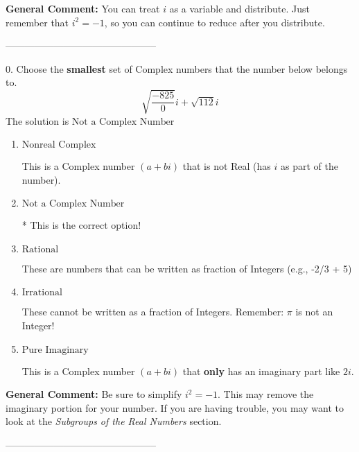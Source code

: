 \documentclass{extbook}[14pt]
\begin{document}
\textbf{General Comment:} You can treat $i$ as a variable and distribute. Just remember that $i^2=-1$, so you can continue to reduce after you distribute. 

-----------------------------------------------

0. Choose the \textbf{smallest} set of Complex numbers that the number below belongs to.
\[ \sqrt{\frac{-825}{0}} i+\sqrt{112}i \] 
The solution is $ \text{Not a Complex Number} $ 

\begin{enumerate}[label=\Alph*.] 
\item $ \text{Nonreal Complex} $ 

 This is a Complex number $(a+bi)$ that is not Real (has $i$ as part of the number). 
\item $ \text{Not a Complex Number} $ 

 * This is the correct option! 
\item $ \text{Rational} $ 

 These are numbers that can be written as fraction of Integers (e.g., -2/3 + 5) 
\item $ \text{Irrational} $ 

 These cannot be written as a fraction of Integers. Remember: $\pi$ is not an Integer! 
\item $ \text{Pure Imaginary} $ 

 This is a Complex number $(a+bi)$ that \textbf{only} has an imaginary part like $2i$. 
\end{enumerate} 
 
\textbf{General Comment:} Be sure to simplify $i^2 = -1$. This may remove the imaginary portion for your number. If you are having trouble, you may want to look at the \textit{Subgroups of the Real Numbers} section. 

-----------------------------------------------
\end{document}
